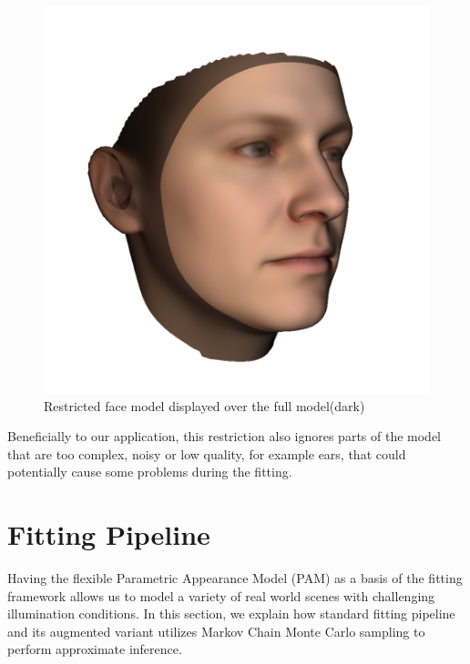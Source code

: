 \begin{figure}
\begin{minipage}{.33\textwidth}
    \end{minipage}
    \begin{minipage}{.32\textwidth}
        \centering
        \includegraphics[width=\textwidth]{Figures/Pictures/sideB_t.png}
    \end{minipage}
    \caption{Restricted face model displayed over the full model(dark)}
    \label{f2.2}
\end{figure}

Beneficially to our application, this restriction also ignores parts of the model that are too complex, noisy or low quality, for example ears, that could potentially cause some problems during the fitting.
\section{Fitting Pipeline}
Having the flexible Parametric Appearance Model (PAM) as a basis of the fitting framework allows us to model a variety of real world scenes with challenging illumination conditions. In this section, we explain how standard fitting pipeline and its augmented variant utilizes Markov Chain Monte Carlo sampling to perform approximate inference.\bigskip  

